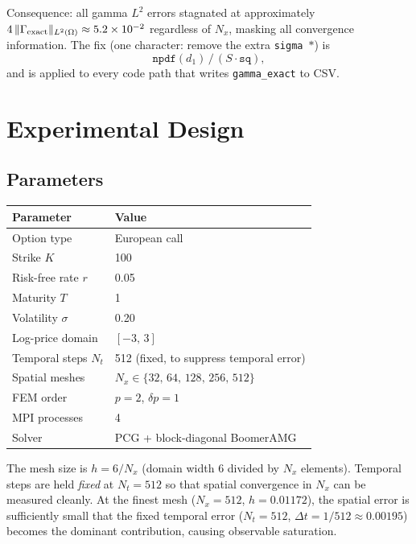 \documentclass[11pt,a4paper]{article}
\newcommand{\Nx}{N_x}
\begin{document}
Consequence: all gamma $L^2$ errors stagnated at approximately
$4\,\|\Gamma_{\rm exact}\|_{L^2(\Omega)} \approx 5.2 \times 10^{-2}$
regardless of $\Nx$, masking all convergence information.
The fix (one character: remove the extra \texttt{sigma}~$*$) is
\[
  \texttt{npdf}(d_1)\,/\,(S \cdot \texttt{sq}),
\]
and is applied to every code path that writes \texttt{gamma\_exact} to CSV.

\section{Experimental Design}

\subsection{Parameters}

\begin{center}
\begin{tabular}{ll}
\toprule
Parameter & Value \\
\midrule
Option type         & European call \\
Strike $K$          & 100 \\
Risk-free rate $r$  & 0.05 \\
Maturity $T$        & 1 \\
Volatility $\sigma$ & 0.20 \\
Log-price domain    & $[-3,\,3]$ \\
Temporal steps $N_t$ & 512 (fixed, to suppress temporal error) \\
Spatial meshes      & $\Nx \in \{32,\,64,\,128,\,256,\,512\}$ \\
FEM order           & $p = 2$, $\delta p = 1$ \\
MPI processes       & 4 \\
Solver              & PCG + block-diagonal BoomerAMG \\
\bottomrule
\end{tabular}
\end{center}

The mesh size is $h = 6/\Nx$ (domain width 6 divided by $\Nx$ elements).
Temporal steps are held \emph{fixed} at $N_t = 512$ so that spatial convergence
in $\Nx$ can be measured cleanly.  At the finest mesh ($\Nx = 512$, $h = 0.01172$),
the spatial error is sufficiently small that the fixed temporal error
($N_t = 512$, $\Delta t = 1/512 \approx 0.00195$) becomes the dominant
contribution, causing observable saturation.
\end{document}
